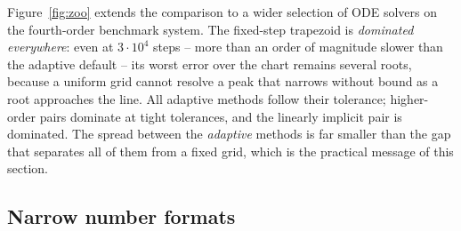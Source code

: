 Figure~\ref{fig:zoo} extends the comparison to a wider selection of ODE
solvers on the fourth-order benchmark system. The fixed-step trapezoid is
\emph{dominated everywhere}: even at $3\cdot10^{4}$ steps -- more than an
order of magnitude slower than the adaptive default -- its worst error over
the chart remains several roots, because a uniform grid cannot resolve a
peak that narrows without bound as a root approaches the line. All adaptive
methods follow their tolerance; higher-order pairs dominate at tight
tolerances, and the linearly implicit pair is dominated. The spread between
the \emph{adaptive}
methods is far smaller than the gap that separates all of them from a fixed
grid, which is the practical message of this section.
\subsection{Narrow number formats}\label{app:precision}

\begin{table}[tb]
  \centering
  \caption{The discrete march with $\Dfun$ evaluated in narrow number formats
  ($400\times400$ chart of the fourth-order benchmark, $\wmax=15$, best of four
  frequency scalings $\lam=\Omega\mu$ per format; the march itself runs in
  Float32). \emph{Flagged} points carry a sub-resolution or residual flag and
  are re-checked in a wider format; \emph{failed} points did not reach $\wmax$.
  $^\ast$Emulated: every operation is rounded to the format.}\label{tab:precision}
\end{table}

